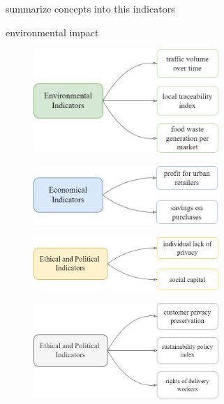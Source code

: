 summarize concepts into this indicators

    environmental impact

    \begin{figure}[h!]
        \centering
        \includegraphics[width=7cm]{figs/env}
        \label{fig:env}
      \end{figure}
      
 
    \begin{figure}[h!]
        \centering
        \includegraphics[width=7cm]{figs/econ}
        \label{fig:env}
      \end{figure}


    \begin{figure}[h!]
        \centering
        \includegraphics[width=7cm]{figs/health}
        \label{fig:env}
      \end{figure}


    \begin{figure}[h!]
        \centering
        \includegraphics[width=7cm]{figs/ethic}
        \label{fig:env}
      \end{figure}

